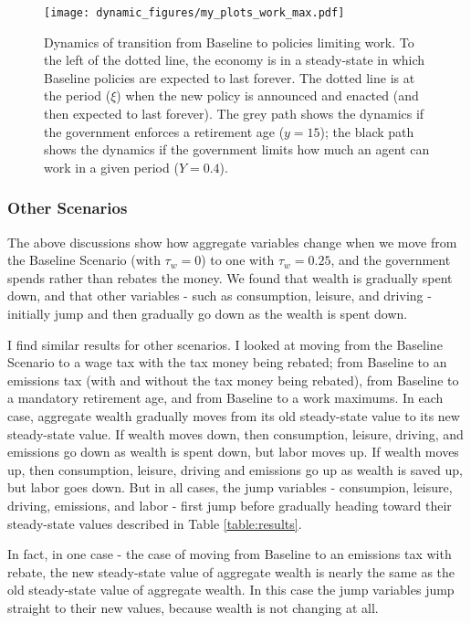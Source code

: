 \documentclass[letter, 12pt, epsf,leqno]{article}
\begin{document}
\begin{figure}[H]
\centering
\texttt{[image: dynamic\_figures/my\_plots\_work\_max.pdf]}
\caption{Dynamics of transition from Baseline to policies limiting work.  To the left of the dotted line, the economy is in a steady-state in which Baseline policies are expected to last forever.  The dotted line is at the period ($\xi$) when the new policy is announced and enacted (and then expected to last forever).  The grey path shows the dynamics if the government enforces a retirement age ($y=15$); the black path shows the dynamics if the government limits how much an agent can work in a given period ($Y=0.4$).}
\label{figure:work_limit_dyn}
\end{figure}


\subsubsection{Other Scenarios}

The above discussions show how aggregate variables change when we move from the Baseline Scenario (with $\tau_w=0$) to one with $\tau_w=0.25$, and the government spends rather than rebates the money.   We found that wealth is gradually spent down, and that other variables - such as consumption, leisure, and driving -initially jump and then gradually go down as the wealth is spent down.\par

I find similar results for other scenarios.  I looked at moving from the Baseline Scenario to a wage tax with the tax money being rebated; from Baseline to an emissions tax (with and without the tax money being rebated), from Baseline to a mandatory retirement age, and from Baseline to a work maximums.  In each case, aggregate wealth gradually moves from its old steady-state value to its new steady-state value.  If wealth moves down, then consumption, leisure, driving, and emissions go down as wealth is spent down, but labor moves up.  If wealth moves up, then consumption, leisure, driving and emissions go up as wealth is saved up, but labor goes down.  But in all cases, the jump variables - consumpion, leisure, driving, emissions, and labor - first jump before gradually heading toward their steady-state values described in Table \ref{table:results}.\par

In fact, in one case - the case of moving from Baseline to an emissions tax with rebate, the new steady-state value of aggregate wealth is nearly the same as the old steady-state value of aggregate wealth. In this case the jump variables jump straight to their new values, because wealth is not changing at all.
\end{document}
